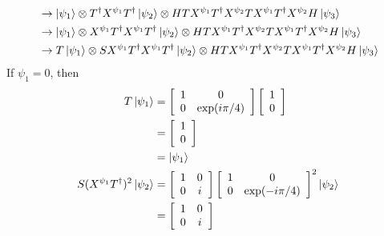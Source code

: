 \documentclass[a4paper,12pt]{article}
\begin{document}
\begin{enumerate}
\begin{align*}
            &\rightarrow \ket{\psi_1} \otimes T^\dagger X^{\psi_1} T^\dagger \ket{\psi_2} \otimes H T X^{\psi_1} T^\dagger X^{\psi_2} T X^{\psi_1} T^\dagger X^{\psi_2} H \ket{\psi_3} \\
            &\rightarrow \ket{\psi_1} \otimes X^{\psi_1} T^\dagger X^{\psi_1} T^\dagger \ket{\psi_2} \otimes H T X^{\psi_1} T^\dagger X^{\psi_2} T X^{\psi_1} T^\dagger X^{\psi_2} H \ket{\psi_3} \\
            &\rightarrow T \ket{\psi_1} \otimes S X^{\psi_1} T^\dagger X^{\psi_1} T^\dagger \ket{\psi_2} \otimes H T X^{\psi_1} T^\dagger X^{\psi_2} T X^{\psi_1} T^\dagger X^{\psi_2} H \ket{\psi_3} \\
        \end{align*}
        \fi
        If $\psi_1 = 0$, then
        \begin{align*}
            T \ket{\psi_1}
            &= \left[ \begin{array}{cc}
                1 & 0 \\
                0 & \mbox{exp}(i \pi / 4)
            \end{array} \right]
            \left[ \begin{array}{c}
                1 \\
                0
            \end{array} \right] \\
            &= \left[ \begin{array}{c}
                1 \\
                0
            \end{array} \right] \\
            &= \ket{\psi_1} \\
            S (X^{\psi_1} T^\dagger)^2 \ket{\psi_2}
            &= \left[ \begin{array}{cc}
                1 & 0 \\
                0 & i
            \end{array} \right]
            \left[ \begin{array}{cc}
                1 & 0 \\
                0 & \mbox{exp}(-i \pi/ 4)
            \end{array} \right]^2 \ket{\psi_2} \\
            &= \left[ \begin{array}{cc}
                1 & 0 \\
                0 & i
            \end{array} \right]

\end{align*}
\end{enumerate}
\end{document}
